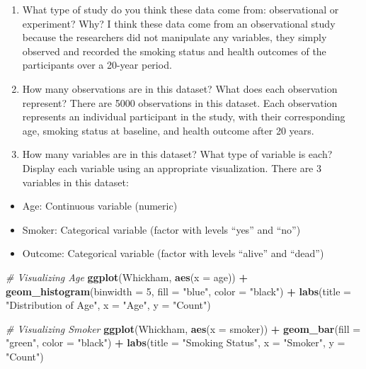 \documentclass[
]{article}
\newenvironment{Shaded}{\begin{snugshade}}{\end{snugshade}}
\newcommand{\AttributeTok}[1]{\textcolor[rgb]{0.13,0.29,0.53}{#1}}
\newcommand{\CommentTok}[1]{\textcolor[rgb]{0.56,0.35,0.01}{\textit{#1}}}
\newcommand{\DecValTok}[1]{\textcolor[rgb]{0.00,0.00,0.81}{#1}}
\newcommand{\FunctionTok}[1]{\textcolor[rgb]{0.13,0.29,0.53}{\textbf{#1}}}
\newcommand{\NormalTok}[1]{#1}
\newcommand{\SpecialCharTok}[1]{\textcolor[rgb]{0.81,0.36,0.00}{\textbf{#1}}}
\newcommand{\StringTok}[1]{\textcolor[rgb]{0.31,0.60,0.02}{#1}}
\providecommand{\tightlist}{%
  \setlength{\itemsep}{0pt}\setlength{\parskip}{0pt}}
\begin{document}
\begin{enumerate}
\def\labelenumi{\arabic{enumi}.}
\item
  What type of study do you think these data come from: observational or
  experiment? Why? I think these data come from an observational study
  because the researchers did not manipulate any variables, they simply
  observed and recorded the smoking status and health outcomes of the
  participants over a 20-year period.
\item
  How many observations are in this dataset? What does each observation
  represent? There are 5000 observations in this dataset. Each
  observation represents an individual participant in the study, with
  their corresponding age, smoking status at baseline, and health
  outcome after 20 years.
\item
  How many variables are in this dataset? What type of variable is each?
  Display each variable using an appropriate visualization. There are 3
  variables in this dataset:
\end{enumerate}

\begin{itemize}
\tightlist
\item
  Age: Continuous variable (numeric)
\item
  Smoker: Categorical variable (factor with levels ``yes'' and ``no'')
\item
  Outcome: Categorical variable (factor with levels ``alive'' and
  ``dead'')
\end{itemize}

\begin{Shaded}
\begin{Highlighting}[]
\CommentTok{\# Visualizing Age}
\FunctionTok{ggplot}\NormalTok{(Whickham, }\FunctionTok{aes}\NormalTok{(}\AttributeTok{x =}\NormalTok{ age)) }\SpecialCharTok{+}
  \FunctionTok{geom\_histogram}\NormalTok{(}\AttributeTok{binwidth =} \DecValTok{5}\NormalTok{, }\AttributeTok{fill =} \StringTok{"blue"}\NormalTok{, }\AttributeTok{color =} \StringTok{"black"}\NormalTok{) }\SpecialCharTok{+}
  \FunctionTok{labs}\NormalTok{(}\AttributeTok{title =} \StringTok{"Distribution of Age"}\NormalTok{, }\AttributeTok{x =} \StringTok{"Age"}\NormalTok{, }\AttributeTok{y =} \StringTok{"Count"}\NormalTok{)}
\end{Highlighting}
\end{Shaded}

\begin{Shaded}
\begin{Highlighting}[]
\CommentTok{\# Visualizing Smoker}
\FunctionTok{ggplot}\NormalTok{(Whickham, }\FunctionTok{aes}\NormalTok{(}\AttributeTok{x =}\NormalTok{ smoker)) }\SpecialCharTok{+}
  \FunctionTok{geom\_bar}\NormalTok{(}\AttributeTok{fill =} \StringTok{"green"}\NormalTok{, }\AttributeTok{color =} \StringTok{"black"}\NormalTok{) }\SpecialCharTok{+}
  \FunctionTok{labs}\NormalTok{(}\AttributeTok{title =} \StringTok{"Smoking Status"}\NormalTok{, }\AttributeTok{x =} \StringTok{"Smoker"}\NormalTok{, }\AttributeTok{y =} \StringTok{"Count"}\NormalTok{)}
\end{Highlighting}
\end{Shaded}
\end{document}
